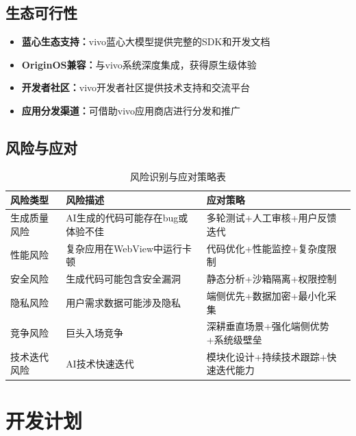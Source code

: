 \documentclass[a4paper,12pt]{ctexart}
\newcommand{\highlight}[1]{\textcolor{vivoblue}{\textbf{#1}}}
\begin{document}
\subsection{生态可行性}

\begin{itemize}[leftmargin=2em]
    \item \highlight{蓝心生态支持：}vivo蓝心大模型提供完整的SDK和开发文档
    \item \highlight{OriginOS兼容：}与vivo系统深度集成，获得原生级体验
    \item \highlight{开发者社区：}vivo开发者社区提供技术支持和交流平台
    \item \highlight{应用分发渠道：}可借助vivo应用商店进行分发和推广
\end{itemize}

\subsection{风险与应对}

\begin{table}[H]
    \centering
    \caption{风险识别与应对策略表}
    \begin{tabularx}{\textwidth}{|l|X|X|}
        \hline
        \textbf{风险类型} & \textbf{风险描述} & \textbf{应对策略} \\
        \hline
        生成质量风险 & AI生成的代码可能存在bug或体验不佳 & 多轮测试+人工审核+用户反馈迭代 \\
        \hline
        性能风险 & 复杂应用在WebView中运行卡顿 & 代码优化+性能监控+复杂度限制 \\
        \hline
        安全风险 & 生成代码可能包含安全漏洞 & 静态分析+沙箱隔离+权限控制 \\
        \hline
        隐私风险 & 用户需求数据可能涉及隐私 & 端侧优先+数据加密+最小化采集 \\
        \hline
        竞争风险 & 巨头入场竞争 & 深耕垂直场景+强化端侧优势+系统级壁垒 \\
        \hline
        技术迭代风险 & AI技术快速迭代 & 模块化设计+持续技术跟踪+快速迭代能力 \\
        \hline
    \end{tabularx}
\end{table}

\section{开发计划}
\end{document}
